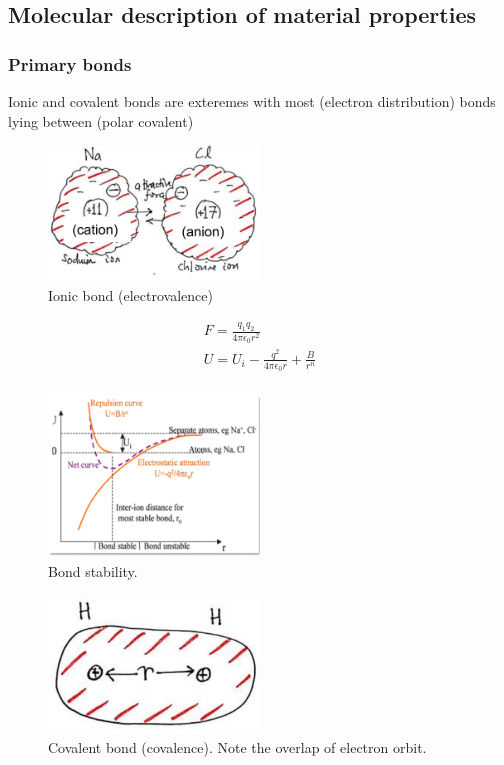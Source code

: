 \documentclass[class=report, crop=false, 12pt,a4paper]{standalone}
\begin{document}
\subsection{Molecular description of material properties}
\subsubsection{Primary bonds}
Ionic and covalent bonds are exteremes with most (electron distribution) bonds lying between (polar covalent)
\begin{figure}[H]
	\centering
	\includegraphics[width = 0.5\textwidth]{../img/figure7.png}
	\caption{Ionic bond (electrovalence)}
\end{figure}
\begin{gather}
	F = \frac{q_1 q_2}{4\pi \epsilon_0 r^2}\\
	U = U_i - \frac{q^2}{4\pi\epsilon_0 r} + \frac{B}{r^n}
\end{gather}
\begin{figure}[H]
	\centering
	\includegraphics[width = 0.5\textwidth]{../img/figure8.png}
	\caption{Bond stability.}
\end{figure}
\begin{figure}[H]
	\centering
	\includegraphics[width = 0.5\textwidth]{../img/figure9.png}
	\caption{Covalent bond (covalence). Note the overlap of electron orbit.}
\end{figure}
\end{document}
